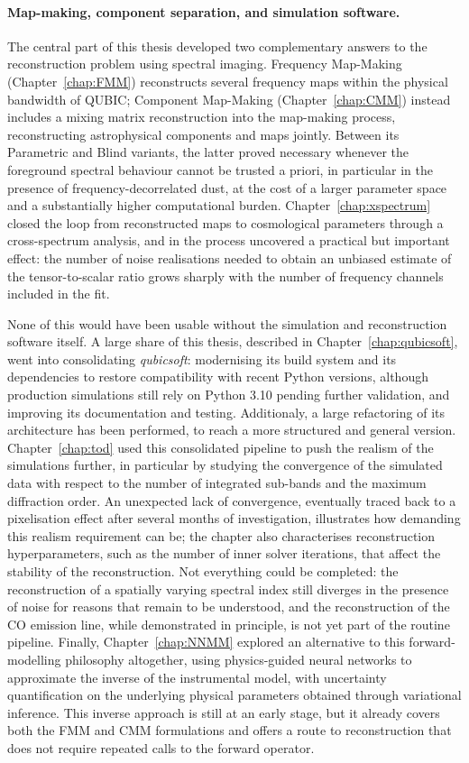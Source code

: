 \documentclass[../../thesis.tex]{subfiles}
\begin{document}
\paragraph{Map-making, component separation, and simulation software.}
The central part of this thesis developed two complementary answers to the reconstruction problem using spectral imaging. Frequency Map-Making (Chapter~\ref{chap:FMM}) reconstructs several frequency maps within the physical bandwidth of QUBIC; Component Map-Making (Chapter~\ref{chap:CMM}) instead includes a mixing matrix reconstruction into the map-making process, reconstructing astrophysical components and maps jointly. Between its Parametric and Blind variants, the latter proved necessary whenever the foreground spectral behaviour cannot be trusted a priori, in particular in the presence of frequency-decorrelated dust, at the cost of a larger parameter space and a substantially higher computational burden. Chapter~\ref{chap:xspectrum} closed the loop from reconstructed maps to cosmological parameters through a cross-spectrum analysis, and in the process uncovered a practical but important effect: the number of noise realisations needed to obtain an unbiased estimate of the tensor-to-scalar ratio grows sharply with the number of frequency channels included in the fit.

None of this would have been usable without the simulation and reconstruction software itself. A large share of this thesis, described in Chapter~\ref{chap:qubicsoft}, went into consolidating \emph{qubicsoft}: modernising its build system and its dependencies to restore compatibility with recent Python versions, although production simulations still rely on Python 3.10 pending further validation, and improving its documentation and testing. Additionaly, a large refactoring of its architecture has been performed, to reach a more structured and general version. Chapter~\ref{chap:tod} used this consolidated pipeline to push the realism of the simulations further, in particular by studying the convergence of the simulated data with respect to the number of integrated sub-bands and the maximum diffraction order. An unexpected lack of convergence, eventually traced back to a pixelisation effect after several months of investigation, illustrates how demanding this realism requirement can be; the chapter also characterises reconstruction hyperparameters, such as the number of inner solver iterations, that affect the stability of the reconstruction. Not everything could be completed: the reconstruction of a spatially varying spectral index still diverges in the presence of noise for reasons that remain to be understood, and the reconstruction of the CO emission line, while demonstrated in principle, is not yet part of the routine pipeline. Finally, Chapter~\ref{chap:NNMM} explored an alternative to this forward-modelling philosophy altogether, using physics-guided neural networks to approximate the inverse of the instrumental model, with uncertainty quantification on the underlying physical parameters obtained through variational inference. This inverse approach is still at an early stage, but it already covers both the FMM and CMM formulations and offers a route to reconstruction that does not require repeated calls to the forward operator.
\end{document}
